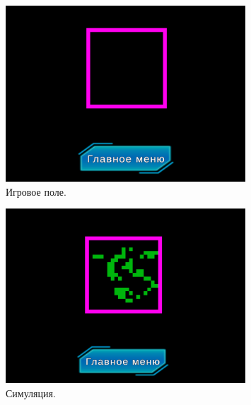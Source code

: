\documentclass[14pt, oneside]{altsu-report}
\begin{document}
\begin{figure}[H]
	\centering
	\includegraphics[width=0.8\textwidth]{images/map.png}  
	\caption{Игровое поле.}
	\label{map}
\end{figure}

\begin{figure}[H]
	\centering
	\includegraphics[width=0.8\textwidth]{images/rand2.png}  
	\caption{Симуляция.}
	\label{uim}
\end{figure}
\end{document}
